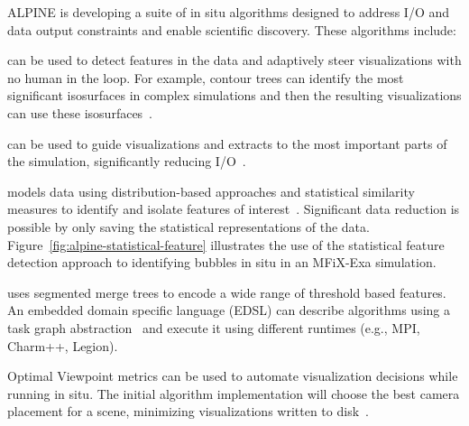 
ALPINE is developing a suite of in situ  algorithms designed to address I/O and data output constraints and enable scientific discovery.   These algorithms include:
\begin{description}  
	\setlength{\itemsep}{1pt}
    \setlength{\parskip}{0pt}
    \setlength{\parsep}{0pt}
	\item [Topological analysis] can be used to detect features in the data and adaptively steer visualizations with no human in the loop.  For example, contour trees can identify the most significant isosurfaces in complex simulations and then the resulting visualizations can use these isosurfaces~\cite{alpine:Carr:TVCG19}.
	\item [Adaptive sampling]  can be used to guide visualizations and extracts to the most important parts of the simulation, significantly reducing I/O~\cite{alpine:Biswas:ISAV18,alpine:Dutta:Entropy19,alpine:Liu:SC19poster}.  %
	\item [Statistical feature detection] models data using distribution-based approaches and statistical similarity measures to identify and isolate features of interest~\cite{alpine:Dutta:PVIS17,alpine:Dutta:VIS15}. Significant data reduction is possible by only saving the statistical representations of the data.  Figure~\ref{fig:alpine-statistical-feature} illustrates the use of the statistical feature detection approach to identifying bubbles in situ in an MFiX-Exa simulation.  
	\item [Task-based feature extraction] uses segmented merge trees to encode a wide range of threshold based features.  An embedded domain specific language (EDSL) can describe algorithms using a  task graph abstraction~\cite{alpine:Landge:SC14,alpine:Petruzza:IPDPS18} and execute it using different runtimes (e.g., MPI, Charm++, Legion).
	\item [Optimal Viewpoint] Optimal Viewpoint metrics can be used to automate visualization decisions while running in situ. The initial algorithm implementation will choose the best camera placement for a scene, minimizing visualizations written to disk~\cite{alpine:Bonaventura:Entropy18,alpine:Marsaglia:UOtech20}.  

\end{description}
